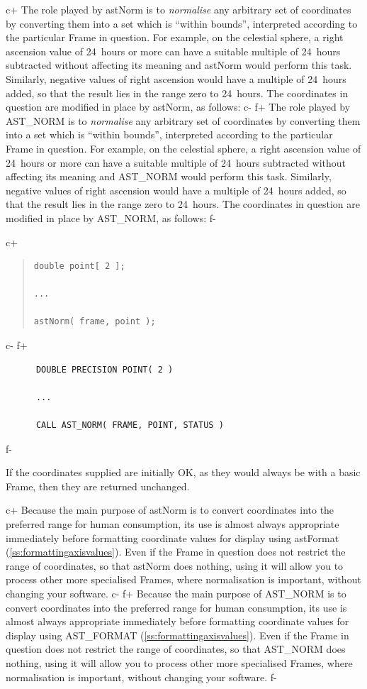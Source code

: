 \documentclass[twoside,11pt]{article}
\newcommand{\secref}[1]{\S\ref{#1}}
\renewcommand{\secref}[1]{\ref{#1}}
\begin{document}
c+
The role played by astNorm is to {\em{normalise}} any arbitrary set of
coordinates by converting them into a set which is ``within bounds'',
interpreted according to the particular Frame in question. For
example, on the celestial sphere, a right ascension value of 24~hours
or more can have a suitable multiple of 24~hours subtracted without
affecting its meaning and astNorm would perform this task. Similarly,
negative values of right ascension would have a multiple of 24~hours
added, so that the result lies in the range zero to 24~hours. The
coordinates in question are modified in place by astNorm, as follows:
c-
f+
The role played by AST\_NORM is to {\em{normalise}} any arbitrary set
of coordinates by converting them into a set which is ``within
bounds'', interpreted according to the particular Frame in
question. For example, on the celestial sphere, a right ascension
value of 24~hours or more can have a suitable multiple of 24~hours
subtracted without affecting its meaning and AST\_NORM would perform
this task. Similarly, negative values of right ascension would have a
multiple of 24~hours added, so that the result lies in the range zero
to 24~hours. The coordinates in question are modified in place by
AST\_NORM, as follows:
f-

c+
\begin{quote}
\small
\begin{verbatim}
double point[ 2 ];

...

astNorm( frame, point );
\end{verbatim}
\normalsize
\end{quote}
c-
f+
\small
\begin{verbatim}
      DOUBLE PRECISION POINT( 2 )

      ...

      CALL AST_NORM( FRAME, POINT, STATUS )
\end{verbatim}
\normalsize
f-

If the coordinates supplied are initially OK, as they would always be
with a basic Frame, then they are returned unchanged.

c+
Because the main purpose of astNorm is to convert coordinates into the
preferred range for human consumption, its use is almost always
appropriate immediately before formatting coordinate values for
display using astFormat (\secref{ss:formattingaxisvalues}). Even if
the Frame in question does not restrict the range of coordinates, so
that astNorm does nothing, using it will allow you to process other
more specialised Frames, where normalisation is important, without
changing your software.
c-
f+
Because the main purpose of AST\_NORM is to convert coordinates into
the preferred range for human consumption, its use is almost always
appropriate immediately before formatting coordinate values for
display using AST\_FORMAT (\secref{ss:formattingaxisvalues}). Even if
the Frame in question does not restrict the range of coordinates, so
that AST\_NORM does nothing, using it will allow you to process other
more specialised Frames, where normalisation is important, without
changing your software.
f-
\end{document}
